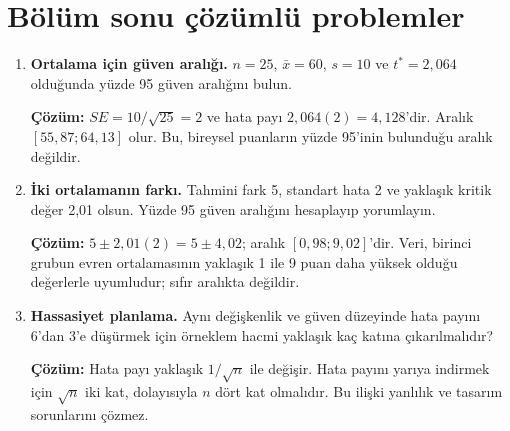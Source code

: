 \section{Bölüm sonu çözümlü problemler}

\begin{enumerate}
  \item \textbf{Ortalama için güven aralığı.} $n=25$, $\bar x=60$, $s=10$ ve $t^*=2{,}064$ olduğunda yüzde 95 güven aralığını bulun.

  \textbf{Çözüm:} $SE=10/\sqrt{25}=2$ ve hata payı $2{,}064(2)=4{,}128$'dir. Aralık $[55{,}87;64{,}13]$ olur. Bu, bireysel puanların yüzde 95'inin bulunduğu aralık değildir.

  \item \textbf{İki ortalamanın farkı.} Tahmini fark 5, standart hata 2 ve yaklaşık kritik değer 2,01 olsun. Yüzde 95 güven aralığını hesaplayıp yorumlayın.

  \textbf{Çözüm:} $5\pm2{,}01(2)=5\pm4{,}02$; aralık $[0{,}98;9{,}02]$'dir. Veri, birinci grubun evren ortalamasının yaklaşık 1 ile 9 puan daha yüksek olduğu değerlerle uyumludur; sıfır aralıkta değildir.

  \item \textbf{Hassasiyet planlama.} Aynı değişkenlik ve güven düzeyinde hata payını 6'dan 3'e düşürmek için örneklem hacmi yaklaşık kaç katına çıkarılmalıdır?

  \textbf{Çözüm:} Hata payı yaklaşık $1/\sqrt n$ ile değişir. Hata payını yarıya indirmek için $\sqrt n$ iki kat, dolayısıyla $n$ dört kat olmalıdır. Bu ilişki yanlılık ve tasarım sorunlarını çözmez.
\end{enumerate}